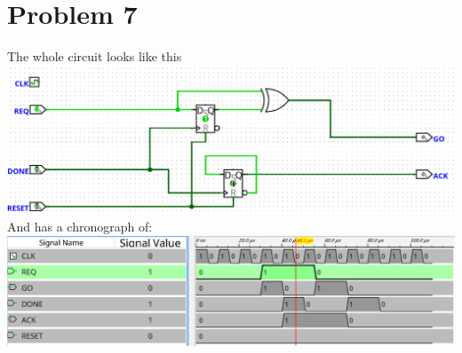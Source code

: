 \documentclass[12pt]{article}
\begin{document}
\section*{Problem 7}
The whole circuit looks like this\\
\includegraphics[scale=0.25]{fig14.png}\\
And has a chronograph of:\\
\includegraphics[scale=0.25]{fig15.png}
\end{document}
